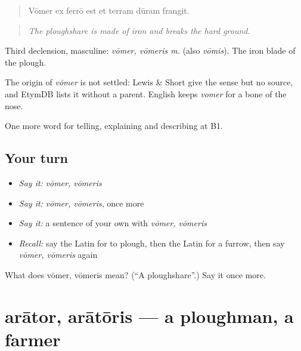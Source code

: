 \begin{quote}
Vōmer ex ferrō est et terram dūram frangit.
\end{quote}

\begin{quote}
\emph{The ploughshare is made of iron and breaks the hard ground.}
\end{quote}

Third declension, masculine: \emph{vōmer, vōmeris m.} (also \emph{vōmis}). The iron blade of the plough.

\begin{cousinweb}
The origin of \emph{vōmer} is not settled: Lewis \& Short give the sense but no source, and EtymDB lists it without a parent. English keeps \emph{vomer} for a bone of the nose.
\end{cousinweb}

\begin{grammarlens}[title={What you've built}]
One more word for telling, explaining and describing at B1.
\end{grammarlens}

\subsection*{Your turn}
\begin{itemize}
\raggedright
  \item \emph{Say it:} \emph{vōmer, vōmeris}
  \item \emph{Say it:} \emph{vōmer, vōmeris}, once more
  \item \emph{Say it:} a sentence of your own with \emph{vōmer, vōmeris}
  \item \emph{Recall:} say the Latin for to plough, then the Latin for a furrow, then say \emph{vōmer, vōmeris} again
\end{itemize}

\begin{tcolorbox}[breakable,colback=teal!4,colframe=teal!35!black,title={Before you move on}]
What does vōmer, vōmeris mean? (\textquotedblleft{}A ploughshare\textquotedblright{}.) Say it once more.
\end{tcolorbox}
\section[arātor, arātōris]{arātor, arātōris — a ploughman, a farmer}

\label{lesson:LA-C474-arator}



